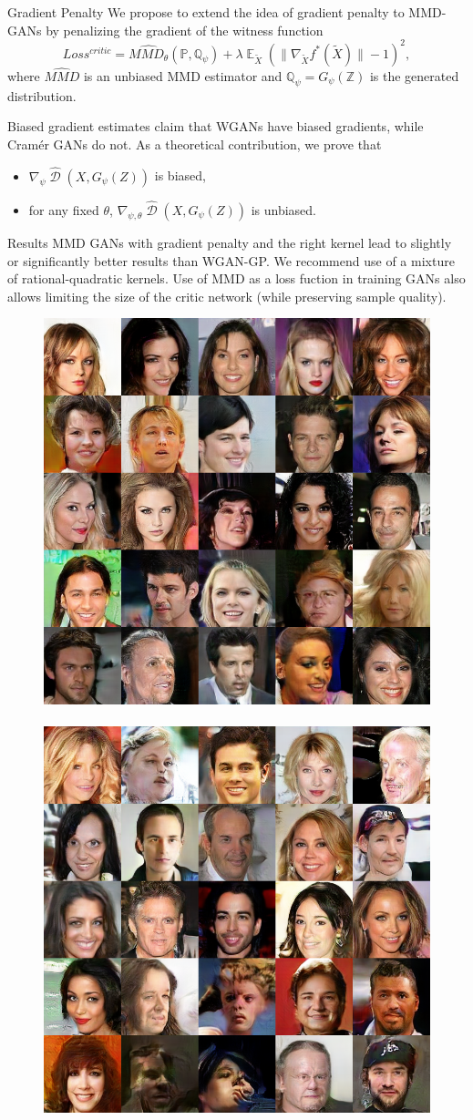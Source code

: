 \documentclass[xcolor={table}]{beamer}
\DeclareMathOperator{\D}{\mathcal{D}}
\DeclareMathOperator*{\E}{\mathbb{E}}
\newcommand{\PP}{\mathbb P}
\newcommand{\QQ}{\mathbb Q}
\newcommand{\ZZ}{\mathbb Z}
\begin{document}
\begin{frame}{}
\begin{columns}[T, totalwidth=\textwidth]
  \begin{column}{.32\textwidth}
    \begin{block}{Gradient Penalty}
      We propose to extend the idea of gradient penalty to MMD-GANs by penalizing the
      gradient of the witness function 
      \[ Loss^{critic} = \widehat{MMD_{\theta}}(\PP, \QQ_{\psi}) + \lambda\E_{\tilde{X}}\left(\|\nabla_{\tilde{X}} f^*(\tilde{X})\| - 1\right)^2, \]
      where $\widehat{MMD}$ is an unbiased MMD estimator and $\QQ_{\psi} = G_{\psi}(\ZZ)$ is the generated distribution.
    \end{block}
    \begin{block}{Biased gradient estimates}
      \citet{cramer-gan} claim that WGANs have biased gradients, while Cram\'er GANs do not. 
      As a theoretical contribution, we prove that
      \begin{itemize} 
        \item $\nabla_{\psi}\widehat{\D}(X, G_{\psi}(Z))$ is biased,
        \item for any fixed $\theta$, $\nabla_{\psi, \theta} \widehat{\D}(X, G_{\psi}(Z))$ is unbiased.
      \end{itemize}
    \end{block}
    \begin{block}{Results}
      MMD GANs with gradient penalty and the right kernel lead to slightly or significantly better results 
      than WGAN-GP. We recommend use of a mixture of rational-quadratic kernels.
      Use of MMD as a loss fuction in training GANs also allows limiting the size of the critic 
      network (while preserving sample quality). 
    \end{block}
    \begin{figure}
      \centering
      \includegraphics[width=.32\columnwidth]{samples/celeba-mmd-rq-25.png}
      ~
      \includegraphics[width=.32\columnwidth]{samples/celeba-wgan-25.png}

\end{figure}
\end{column}
\end{columns}
\end{frame}
\end{document}
